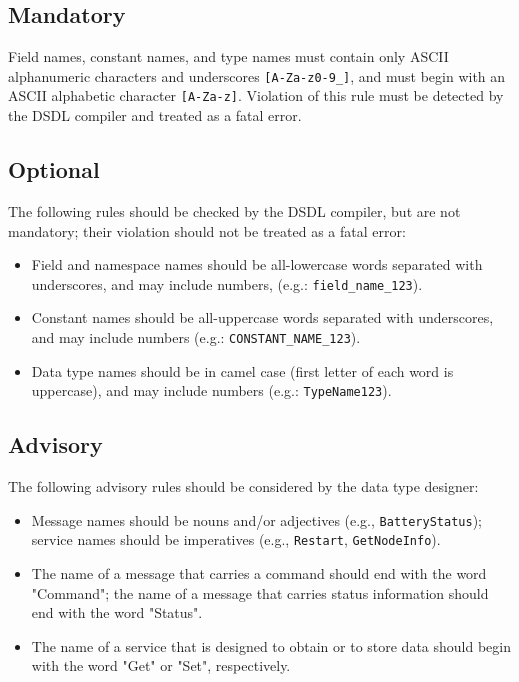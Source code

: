 \subsection{Mandatory}

Field names, constant names, and type names must contain only ASCII alphanumeric characters and underscores
\verb|[A-Za-z0-9_]|,
and must begin with an ASCII alphabetic character \verb|[A-Za-z]|.
Violation of this rule must be detected by the DSDL compiler and treated as a fatal error.

\subsection{Optional}

The following rules should be checked by the DSDL compiler, but are not mandatory;
their violation should not be treated as a fatal error:

\begin{itemize}
    \item Field and namespace names should be all-lowercase words separated with underscores,
          and may include numbers, (e.g.: \verb|field_name_123|).

    \item Constant names should be all-uppercase words separated with underscores,
          and may include numbers (e.g.: \verb|CONSTANT_NAME_123|).

    \item Data type names should be in camel case (first letter of each word is uppercase),
          and may include numbers (e.g.: \verb|TypeName123|).
\end{itemize}

\subsection{Advisory}

The following advisory rules should be considered by the data type designer:

\begin{itemize}
    \item Message names should be nouns and/or adjectives (e.g., \verb|BatteryStatus|);
    service names should be imperatives (e.g., \verb|Restart|, \verb|GetNodeInfo|).

    \item The name of a message that carries a command should end with the word "Command";
          the name of a message that carries status information should end with the word "Status".

    \item The name of a service that is designed to obtain or to store data should begin with the word
          "Get" or "Set", respectively.
\end{itemize}

